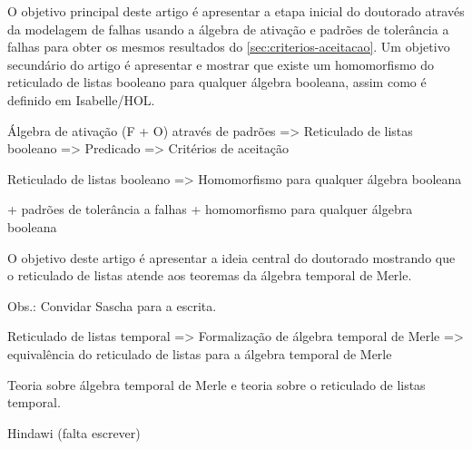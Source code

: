 \documentclass[a5paper,portuges]{article}
\begin{document}
\begin{artigo}
\label{sec:padroes-tolerancia}
\begin{objetivo}
O objetivo principal deste artigo é apresentar a etapa inicial do doutorado através da modelagem de falhas usando a álgebra de ativação e padrões de tolerância a falhas para obter os mesmos resultados do \cref{sec:criterios-aceitacao}. Um objetivo secundário do artigo é apresentar e mostrar que existe um homomorfismo do reticulado de listas booleano para qualquer álgebra booleana, assim como é definido em Isabelle/HOL.
\end{objetivo}
\begin{fluxo}
Álgebra de ativação (F + O) através de padrões => Reticulado de listas booleano => Predicado => Critérios de aceitação

Reticulado de listas booleano => Homomorfismo para qualquer álgebra booleana
\end{fluxo}
\begin{paraconseguir}
 + padrões de tolerância a falhas + homomorfismo para qualquer álgebra booleana 
\end{paraconseguir}
\end{artigo}

\begin{artigo}
\label{sec:algebra-merle}
\begin{objetivo}
O objetivo deste artigo é apresentar a ideia central do doutorado mostrando que o reticulado de listas atende aos teoremas da álgebra temporal de Merle. 

Obs.: Convidar Sascha para a escrita.
\end{objetivo}

\begin{fluxo}
Reticulado de listas temporal => Formalização de álgebra temporal de Merle => equivalência do reticulado de listas para a álgebra temporal de Merle
\end{fluxo}

\begin{paraconseguir}
Teoria sobre álgebra temporal de Merle e teoria sobre o reticulado de listas temporal. 
\end{paraconseguir}
\begin{submissao}
  \item Hindawi (falta escrever)
\end{submissao}
\end{artigo}

\begin{artigo}
\end{artigo}

\begin{artigo}
\end{artigo}
\end{document}
